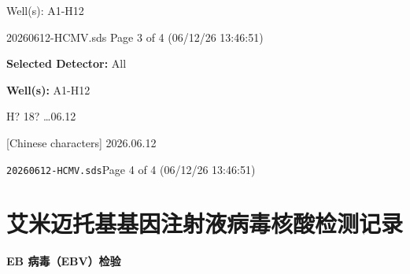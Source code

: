 \documentclass[UTF8,10pt,a4paper,fontset=fandol]{ctexart}
\newcommand{\handwritten}[1]{#1}
\begin{document}
\noindent Well(s): A1-H12

\vspace{1em}

\noindent\scriptsize 20260612-HCMV.sds
\hfill
\scriptsize Page 3 of 4 (06/12/26 13:46:51)

\newpage

\begin{figure}[ht]
\centering
\end{figure}

\noindent
\textbf{Selected Detector:} All

\noindent
\textbf{Well(s):} A1-H12

\vspace{0.5em}

\begin{flushright}
\handwritten{H? 18? \ldots 06.12}

\handwritten{[Chinese characters] 2026.06.12}
\end{flushright}

\vfill

\noindent\texttt{20260612-HCMV.sds}\hfill Page 4 of 4 (06/12/26 13:46:51)

\newpage

\section{艾米迈托基基因注射液病毒核酸检测记录}

\noindent
\textbf{EB 病毒（EBV）检验}
\end{document}

